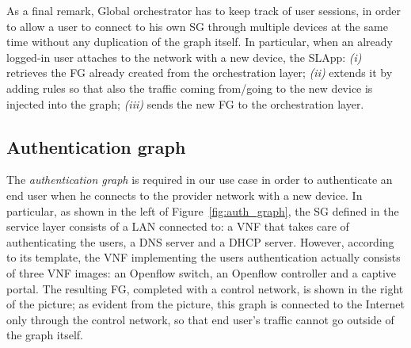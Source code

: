 As a final remark, Global orchestrator has to keep track of user sessions, in order to allow a user to connect to his own SG through multiple devices at the same time without any duplication of the graph itself.
In particular, when an already logged-in user attaches to the network with a new device, the SLApp: \textit{(i)} retrieves the FG already created from the orchestration layer; \textit{(ii)} extends it by adding rules so that also the traffic coming from/going to the new device is injected into the graph; \textit{(iii)} sends the new FG to the orchestration layer.




\subsection{Authentication graph}
\label{sec:auth_graph}

The \textit{authentication graph} is required in our use case in order to authenticate an end user when he connects to the provider network with a new device.
In particular, as shown in the left of Figure~\ref{fig:auth_graph}, the SG defined in the service layer consists of a LAN connected to: a VNF that takes care of authenticating the users, a DNS server and a DHCP server.
However, according to its template, the VNF implementing the users authentication actually consists of three VNF images: an Openflow switch, an Openflow controller and a captive portal. 
The resulting FG, completed with a control network, is shown in the right of the picture; as evident from the picture, this graph is connected to the Internet only through the control network, so that end user's traffic cannot go outside of the graph itself.

